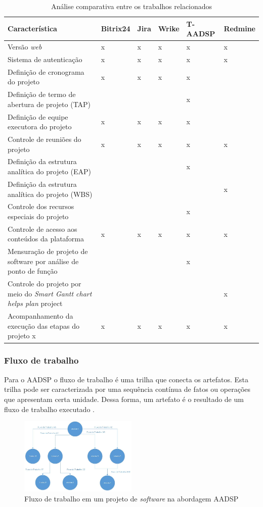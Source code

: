 \documentclass{acm_proc_article-sp}
\begin{document}
\begin{table}[h]
\scriptsize
\caption{Análise comparativa entre os trabalhos relacionados} 
\centering
\begin{tabular}{|p{60mm}|p{15mm}|p{15mm}|p{15mm}|p{15mm}|p{15mm}|}
\hline
 \textbf{Característica} & \textbf{Bitrix24} & \textbf{Jira} & \textbf{Wrike} & \textbf{T-AADSP} & \textbf{Redmine} \\
\hline
Versão \textit{web} & x & x  & x  & x  & x\\
Sistema de autenticação & x & x  & x  & x & x\\
Definição de cronograma do projeto & x & x  & x  & x  & \\
Definição de termo de abertura de projeto (TAP) &  &   &  & x  & \\
Definição de equipe executora do projeto & x & x  & x  & x  &\\
Controle de reuniões do projeto  & x & x  & x  & x  & x\\
Definição da estrutura analítica do projeto (EAP) &  &   &  & x & \\
Definição da estrutura analítica do projeto (WBS) &  &   &  &  & x \\
Controle dos recursos especiais do projeto &  &   &  & x  &\\
Controle de acesso aos conteúdos da plataforma & x & x  & x  & x & x\\
Mensuração de projeto de software por análise de ponto de função  &  &   &  & x & \\
Controle do projeto por meio do \textit{Smart Gantt chart helps plan} project   &  &   &  &  & x \\
Acompanhamento da execução das etapas do projeto x & x & x & x & x & x\\
\hline
\end{tabular}
\end{table}

\subsubsection*{Fluxo de trabalho}
Para o AADSP o fluxo de trabalho é uma trilha que conecta os artefatos. Esta trilha pode ser caracterizada por uma sequência contínua de fatos ou operações que apresentam certa unidade. Dessa forma, um artefato é o resultado de um fluxo de trabalho executado \cite{aadsp:hibirdo}.

\begin{figure}[h]
\centering %
\includegraphics[width=0.5\textwidth]{AADSP_fluxo_de_trabalho.jpg} %
\caption{Fluxo de trabalho em um projeto de \textit{software} na abordagem AADSP  \cite{aadsp:hibirdo}}
\end{figure}
\end{document}
